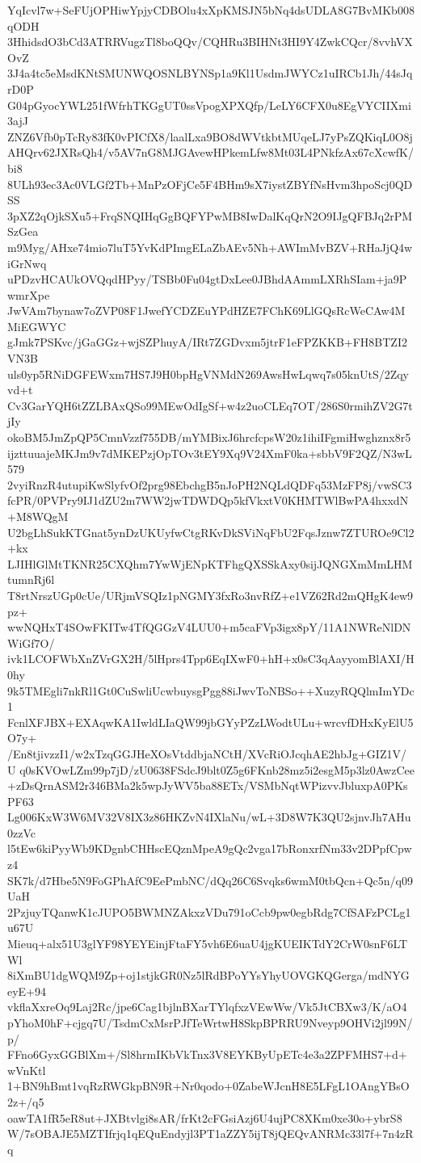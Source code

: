 YqIcvl7w+SeFUjOPHiwYpjyCDBOlu4xXpKMSJN5bNq4dsUDLA8G7BvMKb008qODH
3HhidsdO3bCd3ATRRVugzTl8boQQv/CQHRu3BIHNt3HI9Y4ZwkCQcr/8vvhVXOvZ
3J4a4tc5eMsdKNtSMUNWQOSNLBYNSp1a9Kl1UsdmJWYCz1uIRCb1Jh/44sJqrD0P
G04pGyocYWL251fWfrhTKGgUT0ssVpogXPXQfp/LeLY6CFX0u8EgVYCIIXmi3ajJ
ZNZ6Vfb0pTcRy83fK0vPICfX8/laalLxa9BO8dWVtkbtMUqeLJ7yPsZQKiqL0O8j
AHQrv62JXRsQh4/v5AV7nG8MJGAvewHPkemLfw8Mt03L4PNkfzAx67cXcwfK/bi8
8ULh93ec3Ac0VLGf2Tb+MnPzOFjCe5F4BHm9sX7iystZBYfNsHvm3hpoScj0QDSS
3pXZ2qOjkSXu5+FrqSNQIHqGgBQFYPwMB8IwDalKqQrN2O9IJgQFBJq2rPMSzGea
m9Myg/AHxe74mio7luT5YvKdPImgELaZbAEv5Nh+AWImMvBZV+RHaJjQ4wiGrNwq
uPDzvHCAUkOVQqdHPyy/TSBb0Fu04gtDxLee0JBhdAAmmLXRhSIam+ja9PwmrXpe
JwVAm7bynaw7oZVP08F1JwefYCDZEuYPdHZE7FChK69LlGQsRcWeCAw4MMiEGWYC
gJmk7PSKvc/jGaGGz+wjSZPhuyA/IRt7ZGDvxm5jtrF1eFPZKKB+FH8BTZI2VN3B
uls0yp5RNiDGFEWxm7HS7J9H0bpHgVNMdN269AwsHwLqwq7s05knUtS/2Zqyvd+t
Cv3GarYQH6tZZLBAxQSo99MEwOdIgSf+w4z2uoCLEq7OT/286S0rmihZV2G7tjIy
okoBM5JmZpQP5CmnVzzf755DB/mYMBixJ6hrcfcpsW20z1ihiIFgmiHwghznx8r5
ijzttuuajeMKJm9v7dMKEPzjOpTOv3tEY9Xq9V24XmF0ka+sbbV9F2QZ/N3wL579
2vyiRnzR4utupiKwSlyfvOf2prg98EbchgB5nJoPH2NQLdQDFq53MzFP8j/vwSC3
fcPR/0PVPry9IJ1dZU2m7WW2jwTDWDQp5kfVkxtV0KHMTWlBwPA4hxxdN+M8WQgM
U2bgLhSukKTGnat5ynDzUKUyfwCtgRKvDkSViNqFbU2FqsJznw7ZTUROe9Cl2+kx
LJIHlGlMtTKNR25CXQhm7YwWjENpKTFhgQXSSkAxy0sijJQNGXmMmLHMtumnRj6l
T8rtNrszUGp0cUe/URjmVSQIz1pNGMY3fxRo3nvRfZ+e1VZ62Rd2mQHgK4ew9pz+
wwNQHxT4SOwFKITw4TfQGGzV4LUU0+m5caFVp3igx8pY/11A1NWReNlDNWiGf7O/
ivk1LCOFWbXnZVrGX2H/5lHprs4Tpp6EqIXwF0+hH+x0sC3qAayyomBlAXI/H0hy
9k5TMEgli7nkRl1Gt0CuSwliUcwbuysgPgg88iJwvToNBSo++XuzyRQQlmImYDc1
FcnlXFJBX+EXAqwKA1IwldLIaQW99jbGYyPZzLWodtULu+wrcvfDHxKyElU5O7y+
/En8tjivzzI1/w2xTzqGGJHeXOsVtddbjaNCtH/XVcRiOJcqhAE2hbJg+GIZ1V/U
q0sKVOwLZm99p7jD/zU0638FSdcJ9blt0Z5g6FKnb28mz5i2esgM5p3lz0AwzCee
+zDsQrnASM2r346BMa2k5wpJyWV5ba88ETx/VSMbNqtWPizvvJbluxpA0PKsPF63
Lg006KxW3W6MV32V8IX3z86HKZvN4IXlaNu/wL+3D8W7K3QU2sjnvJh7AHu0zzVc
l5tEw6kiPyyWb9KDgnbCHHscEQznMpeA9gQc2vga17bRonxrfNm33v2DPpfCpwz4
SK7k/d7Hbe5N9FoGPhAfC9EePmbNC/dQq26C6Svqks6wmM0tbQcn+Qc5n/q09UaH
2PzjuyTQanwK1cJUPO5BWMNZAkxzVDu791oCcb9pw0egbRdg7CfSAFzPCLg1u67U
Mieuq+alx51U3glYF98YEYEinjFtaFY5vh6E6uaU4jgKUEIKTdY2CrW0snF6LTWl
8iXmBU1dgWQM9Zp+oj1stjkGR0Nz5lRdBPoYYsYhyUOVGKQGerga/mdNYGeyE+94
vkflaXxreOq9Laj2Rc/jpe6Cag1bjlnBXarTYlqfxzVEwWw/Vk5JtCBXw3/K/aO4
pYhoM0hF+cjgq7U/TsdmCxMsrPJfTeWrtwH8SkpBPRRU9Nveyp9OHVi2jl99N/p/
FFno6GyxGGBlXm+/Sl8hrmIKbVkTnx3V8EYKByUpETc4e3a2ZPFMHS7+d+wVnKtl
1+BN9hBmt1vqRzRWGkpBN9R+Nr0qodo+0ZabeWJcnH8E5LFgL1OAngYBsO2z+/q5
oawTA1fR5eR8ut+JXBtvlgi8sAR/frKt2cFGsiAzj6U4ujPC8XKm0xe30o+ybrS8
W/7sOBAJE5MZTIfrjq1qEQuEndyjl3PT1aZZY5ijT8jQEQvANRMc33l7f+7n4zRq
